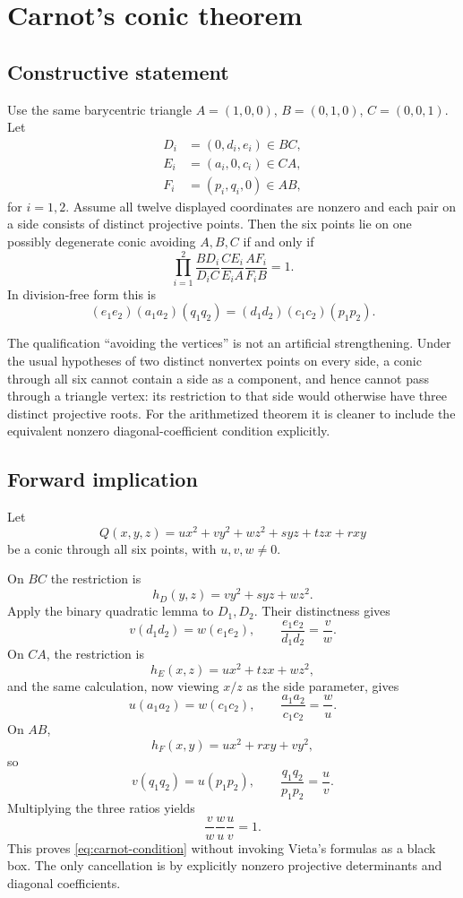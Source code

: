 \section{Carnot's conic theorem}

\subsection{Constructive statement}

Use the same barycentric triangle $A=(1,0,0)$, $B=(0,1,0)$, $C=(0,0,1)$.  Let
\begin{align*}
D_i&=(0,d_i,e_i)\in BC,\\
E_i&=(a_i,0,c_i)\in CA,\\
F_i&=(p_i,q_i,0)\in AB,
\end{align*}
for $i=1,2$.  Assume all twelve displayed coordinates are nonzero and each pair on a side consists of distinct projective points.  Then the six points lie on one possibly degenerate conic avoiding $A,B,C$ if and only if
\[
\prod_{i=1}^{2}
\frac{BD_i}{D_iC}
\frac{CE_i}{E_iA}
\frac{AF_i}{F_iB}=1.
\]
In division-free form this is
\begin{equation}\label{eq:carnot-condition}
(e_1e_2)(a_1a_2)(q_1q_2)
=(d_1d_2)(c_1c_2)(p_1p_2).
\end{equation}

The qualification ``avoiding the vertices'' is not an artificial strengthening.  Under the usual hypotheses of two distinct nonvertex points on every side, a conic through all six cannot contain a side as a component, and hence cannot pass through a triangle vertex: its restriction to that side would otherwise have three distinct projective roots.  For the arithmetized theorem it is cleaner to include the equivalent nonzero diagonal-coefficient condition explicitly.

\subsection{Forward implication}

Let
\[
Q(x,y,z)=ux^2+vy^2+wz^2+s yz+t zx+r xy
\]
be a conic through all six points, with $u,v,w\ne0$.

On $BC$ the restriction is
\[
h_D(y,z)=vy^2+s yz+wz^2.
\]
Apply the binary quadratic lemma to $D_1,D_2$.  Their distinctness gives
\[
v(d_1d_2)=w(e_1e_2),
\qquad
\frac{e_1e_2}{d_1d_2}=\frac vw.
\]
On $CA$, the restriction is
\[
h_E(x,z)=ux^2+t zx+wz^2,
\]
and the same calculation, now viewing $x/z$ as the side parameter, gives
\[
u(a_1a_2)=w(c_1c_2),
\qquad
\frac{a_1a_2}{c_1c_2}=\frac wu.
\]
On $AB$,
\[
h_F(x,y)=ux^2+rxy+vy^2,
\]
so
\[
v(q_1q_2)=u(p_1p_2),
\qquad
\frac{q_1q_2}{p_1p_2}=\frac uv.
\]
Multiplying the three ratios yields
\[
\frac vw\frac wu\frac uv=1.
\]
This proves \eqref{eq:carnot-condition} without invoking Vieta's formulas as a black box.  The only cancellation is by explicitly nonzero projective determinants and diagonal coefficients.

